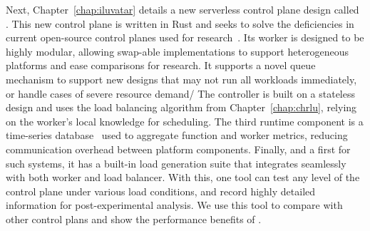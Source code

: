 Next, Chapter~\ref{chap:iluvatar} details a new serverless control plane design called \sysname.
This new control plane is written in Rust and seeks to solve the deficiencies in current open-source control planes used for research~\cite{openwhisk}.
Its worker is designed to be highly modular, allowing swap-able implementations to support heterogeneous platforms and ease comparisons for research.
It supports a novel queue mechanism to support new designs that may not run all workloads immediately, or handle cases of severe resource demand/
The controller is built on a stateless design and uses the load balancing algorithm from Chapter~\ref{chap:chrlu}, relying on the worker's local knowledge for scheduling.
The third runtime component is a time-series database~\cite{influx} used to aggregate function and worker metrics, reducing communication overhead between platform components.
Finally, and a first for such systems, it has a built-in load generation suite that integrates seamlessly with both worker and load balancer.
With this, one tool can test any level of the control plane under various load conditions, and record highly detailed information for post-experimental analysis.
We use this tool to compare with other control plans and show the performance benefits of \sysname.

